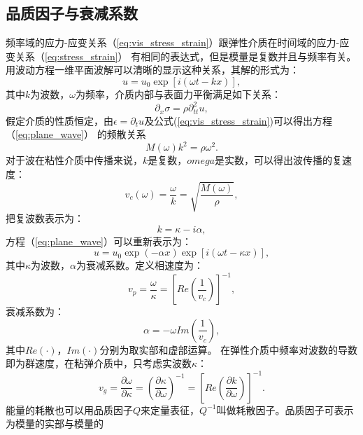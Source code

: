 \subsection{品质因子与衰减系数}
\vspace{0.2cm}
频率域的应力-应变关系（\ref{eq:vis_stress_strain}）跟弹性介质在时间域的应力-应变关系（\ref{eq:stress_strain}）
有相同的表达式，但是模量是复数并且与频率有关。用波动方程一维平面波解可以清晰的显示这种关系，其解的形式为：
\begin{equation}
	u=u_0\exp[i(\omega t-kx)],
	\label{eq:plane_wave}
\end{equation}
其中$k$为波数，$\omega$为频率，介质内部与表面力平衡满足如下关系：
\begin{equation}
	\partial_x\sigma=\rho\partial^2_{tt}u,
\end{equation}
假定介质的性质恒定，由$\epsilon=\partial_t u$及公式(\ref{eq:vis_stress_strain})可以得出方程（\ref{eq:plane_wave}）
的频散关系
\begin{equation}
	M(\omega)k^2=\rho\omega^2.
\end{equation}
对于波在粘性介质中传播来说，$k$是复数，$omega$是实数，可以得出波传播的复速度：
\begin{equation}
	v_c(\omega)=\frac{\omega}{k}=\sqrt{\frac{M(\omega)}{\rho}},
	\label{eq:vc}
\end{equation}
把复波数表示为：
\begin{equation}
	k=\kappa -i\alpha,
\end{equation}
\newpage
方程（\ref{eq:plane_wave}）可以重新表示为：
\begin{equation}
	u=u_0\exp(-\alpha x)\exp[i(\omega t-\kappa x)],
\end{equation}
其中$\kappa$为波数，$\alpha$为衰减系数。定义相速度为：
\begin{equation}
	v_p=\frac{\omega}{\kappa}=[Re(\frac{1}{v_c})]^{-1},
	\label{eq:phase_velocity}
\end{equation}
衰减系数为：
\begin{equation}
	\alpha=-\omega Im(\frac{1}{v_c}),
	\label{eq:alpha}
\end{equation}
其中$Re(\cdot)$，$Im(\cdot)$分别为取实部和虚部运算。
在弹性介质中频率对波数的导数即为群速度，在粘弹介质中，只考虑实波数$\kappa$：
\begin{equation}
	v_g=\frac{\partial \omega}{\partial \kappa}=(\frac{\partial \kappa}{\partial \omega})^{-1}
	=[Re(\frac{\partial k}{\partial \omega})]^{-1}.
\end{equation}
能量的耗散也可以用品质因子$Q$来定量表征，$Q^{-1}$叫做耗散因子。品质因子可表示为模量的实部与模量的
